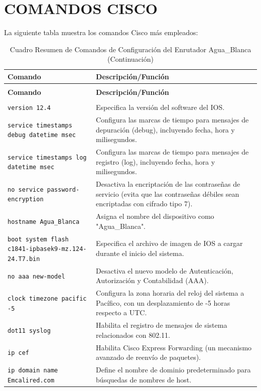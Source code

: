 \documentclass[a5paper]{book}%
\begin{document}
\chapter{COMANDOS CISCO}

La siguiente tabla muestra los comandos Cisco más empleados:


\begin{longtable}{|p{6cm}|p{4cm}|}
	
\hline
\textbf{Comando} & \textbf{Descripción/Función} \\
\hline
\endfirsthead
\caption{Cuadro Resumen de Comandos de Configuración del Enrutador Agua\_Blanca (Continuación)}\\
\hline
\textbf{Comando} & \textbf{Descripción/Función} \\
\hline
\endhead
\hline
\endfoot
\multicolumn{2}{|c|}{\textbf{Configuración General/Sistema}}  \\\hline
\texttt{version 12.4} & Especifica la versión del software del IOS. \\
\texttt{service timestamps debug datetime msec} & Configura las marcas de tiempo para mensajes de depuración (debug), incluyendo fecha, hora y milisegundos. \\
\texttt{service timestamps log datetime msec} & Configura las marcas de tiempo para mensajes de registro (log), incluyendo fecha, hora y milisegundos. \\
\texttt{no service password-encryption} & Desactiva la encriptación de las contraseñas de servicio (evita que las contraseñas débiles sean encriptadas con cifrado tipo 7). \\
\texttt{hostname Agua\_Blanca} & Asigna el nombre del dispositivo como "Agua\_Blanca". \\
\texttt{boot system flash c1841-ipbasek9-mz.124-24.T7.bin} & Especifica el archivo de imagen de IOS a cargar durante el inicio del sistema. \\
\texttt{no aaa new-model} & Desactiva el nuevo modelo de Autenticación, Autorización y Contabilidad (AAA). \\
\texttt{clock timezone pacific -5} & Configura la zona horaria del reloj del sistema a Pacífico, con un desplazamiento de -5 horas respecto a UTC. \\
\texttt{dot11 syslog} & Habilita el registro de mensajes de sistema relacionados con 802.11. \\
\texttt{ip cef} & Habilita Cisco Express Forwarding (un mecanismo avanzado de reenvío de paquetes). \\
\texttt{ip domain name Emcalired.com} & Define el nombre de dominio predeterminado para búsquedas de nombres de host. \\

\end{longtable}
\end{document}
